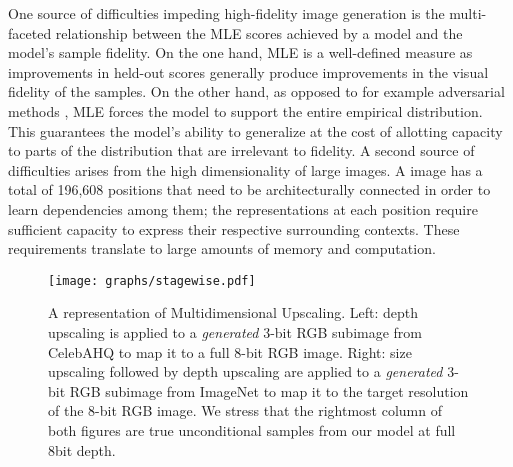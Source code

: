 \documentclass{article} \usepackage{iclr2019_conference,times}
\begin{document}
One source of difficulties impeding high-fidelity image generation is the multi-faceted relationship between the MLE scores achieved by a model and the model's sample fidelity. On the one hand, MLE is a well-defined measure as improvements in held-out scores generally produce improvements in the visual fidelity of the samples. On the other hand, as opposed to for example adversarial methods \citep{birthday}, MLE forces the model to support the entire empirical distribution. This guarantees the model's ability to generalize at the cost of allotting capacity to parts of the distribution that are irrelevant to fidelity. 
A second source of difficulties arises from the high dimensionality of large images. A  image has a total of 196,608 positions that need to be architecturally connected in order to learn dependencies among them; the representations at each position require sufficient capacity to express their respective surrounding contexts. These requirements translate to large amounts of memory and computation.

 \begin{figure}[h]
  \begin{center}
    \texttt{[image: graphs/stagewise.pdf]}
    \caption{A representation of Multidimensional Upscaling. Left: depth upscaling is applied to a \emph{generated} 3-bit  RGB subimage from CelebAHQ to map it to a full 8-bit  RGB image. Right: size upscaling followed by depth upscaling are applied to a \emph{generated} 3-bit  RGB subimage from ImageNet to map it to the target resolution of the 8-bit  RGB image. We stress that the rightmost column of both figures are true unconditional samples from our model at full 8bit depth.}
    \label{fig:size_depth}
  \end{center}
\end{figure}
\end{document}
